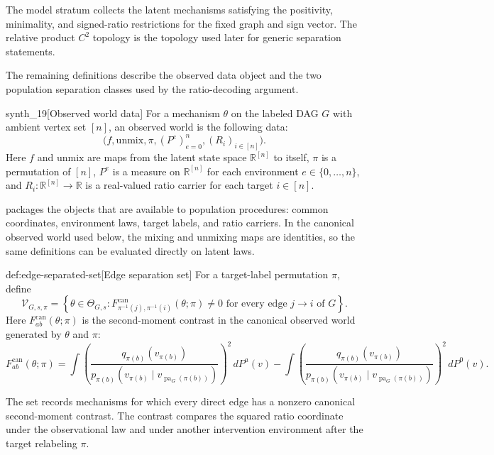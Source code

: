 The model stratum  collects the latent mechanisms satisfying the positivity, minimality, and signed-ratio restrictions for the fixed graph and sign vector. The relative product \(C^2\) topology is the topology used later for generic separation statements.

The remaining definitions describe the observed data object and the two population separation classes used by the ratio-decoding argument.

\begin{definitionv}{synth_19}[Observed world data]
For a mechanism \(\theta\) on the labeled DAG \(G\) with ambient vertex set \([n]\), an observed world is the following data:
\[
\bigl(f,\mathrm{unmix},\pi,(P^e)_{e=0}^n,(R_i)_{i\in[n]}\bigr).
\]
Here \(f\) and \(\mathrm{unmix}\) are maps from the latent state space \(\mathbb R^{[n]}\) to itself, \(\pi\) is a permutation of \([n]\), \(P^e\) is a measure on \(\mathbb R^{[n]}\) for each environment \(e\in\{0,\ldots,n\}\), and \(R_i:\mathbb R^{[n]}\to\mathbb R\) is a real-valued ratio carrier for each target \(i\in[n]\).
\end{definitionv}

 packages the objects that are available to population procedures: common coordinates, environment laws, target labels, and ratio carriers. In the canonical observed world used below, the mixing and unmixing maps are identities, so the same definitions can be evaluated directly on latent laws.

\begin{definitionv}{def:edge-separated-set}[Edge separation set]
For a target-label permutation \(\pi\), define
\[
\mathcal V_{G,s,\pi}
=
\left\{
\theta\in\Theta_{G,s}:
F^{\mathrm{can}}_{\pi^{-1}(j),\pi^{-1}(i)}(\theta;\pi)\ne0
\text{ for every edge }j\to i\text{ of }G
\right\}.
\]
Here \(F^{\mathrm{can}}_{ab}(\theta;\pi)\) is the second-moment contrast in the canonical observed world generated by \(\theta\) and \(\pi\):
\[
F^{\mathrm{can}}_{ab}(\theta;\pi)
=
\int
\left(
\frac{q_{\pi(b)}(v_{\pi(b)})}
     {p_{\pi(b)}(v_{\pi(b)}\mid v_{\operatorname{pa}_G(\pi(b))})}
\right)^2
\,dP^{a}(v)
-
\int
\left(
\frac{q_{\pi(b)}(v_{\pi(b)})}
     {p_{\pi(b)}(v_{\pi(b)}\mid v_{\operatorname{pa}_G(\pi(b))})}
\right)^2
\,dP^0(v).
\]
\end{definitionv}

The set  records mechanisms for which every direct edge has a nonzero canonical second-moment contrast. The contrast  compares the squared ratio coordinate under the observational law and under another intervention environment after the target relabeling \(\pi\).

